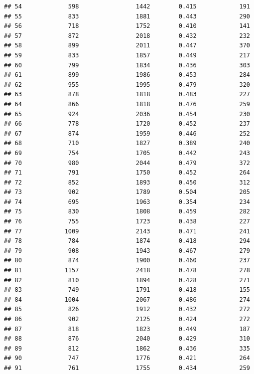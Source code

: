 \documentclass[]{book}
\begin{document}
\begin{verbatim}
## 54             598                1442        0.415            191
## 55             833                1881        0.443            290
## 56             718                1752        0.410            141
## 57             872                2018        0.432            232
## 58             899                2011        0.447            370
## 59             833                1857        0.449            217
## 60             799                1834        0.436            303
## 61             899                1986        0.453            284
## 62             955                1995        0.479            320
## 63             878                1818        0.483            227
## 64             866                1818        0.476            259
## 65             924                2036        0.454            230
## 66             778                1720        0.452            237
## 67             874                1959        0.446            252
## 68             710                1827        0.389            240
## 69             754                1705        0.442            243
## 70             980                2044        0.479            372
## 71             791                1750        0.452            264
## 72             852                1893        0.450            312
## 73             902                1789        0.504            205
## 74             695                1963        0.354            234
## 75             830                1808        0.459            282
## 76             755                1723        0.438            227
## 77            1009                2143        0.471            241
## 78             784                1874        0.418            294
## 79             908                1943        0.467            279
## 80             874                1900        0.460            237
## 81            1157                2418        0.478            278
## 82             810                1894        0.428            271
## 83             749                1791        0.418            155
## 84            1004                2067        0.486            274
## 85             826                1912        0.432            272
## 86             902                2125        0.424            272
## 87             818                1823        0.449            187
## 88             876                2040        0.429            310
## 89             812                1862        0.436            335
## 90             747                1776        0.421            264
## 91             761                1755        0.434            259

\end{verbatim}
\end{document}
